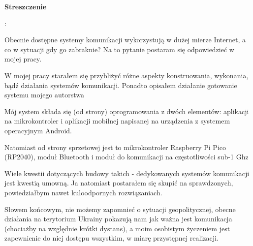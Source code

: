     \cleardoublepage
    \vspace*{2\baselineskip}
    \begin{center}
	{\large\bfseries Streszczenie}\par\bigskip\end{center}
 : \tytulpl
 \par
    \vspace*{1\baselineskip}
    {
  	Obecnie dostępne systemy komunikacji wykorzystują w dużej mierze Internet, a co w sytuacji gdy go zabraknie?
	Na to pytanie postaram się odpowiedzieć w mojej pracy.

	W mojej pracy starałem się przybliżyć różne aspekty konstruowania, wykonania, bądź działania systemów komunikacji.
	Ponadto opisałem działanie gotowanie systemu mojego autorstwa

	Mój system składa się (od strony) oprogramowania z dwóch elementów: aplikacji na mikrokontroler i aplikacji mobilnej napisanej na urządzenia z systemem operacyjnym Android.

	Natomiast od strony sprzetowej jest to mikrokontroler Raspberry Pi Pico (RP2040), moduł Bluetooth i moduł do komunikacji na częstotliwości sub-1 Ghz

	Wiele kwestii dotyczących budowy takich - dedykowanych systemów komunikacji jest kwestią umowną. Ja natomiast postarałem się skupić na sprawdzonych, powiedziałbym nawet kuloodpornych rozwiązaniach.

	Słowem końcowym, nie możemy zapomnieć o sytuacji geopolitycznej, obecne działania na terytorium Ukrainy pokazują nam jak ważna jest komunikacja (chociażby na względnie krótki dystans), a moim osobistym życzeniem jest zapewnienie do niej dostępu wszystkim, w miarę przystępnej realizacji.
    }
    \vspace*{1\baselineskip}

